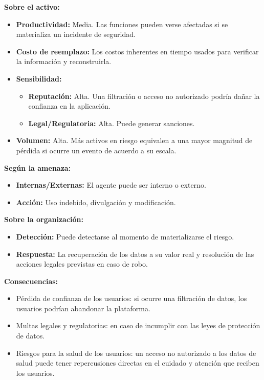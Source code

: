 \documentclass[a4paper,12pt]{article}
\begin{document}
    \par \textbf{Sobre el activo:}
    \begin{itemize}
        \item \textbf{Productividad:} Media. Las funciones pueden verse afectadas si se materializa un incidente de seguridad.
        \item \textbf{Costo de reemplazo:} Los costos inherentes en tiempo usados para verificar la información y reconstruirla.
        \item \textbf{Sensibilidad:}
        \begin{itemize}
            \item \textbf{Reputación:} Alta. Una filtración o acceso no autorizado podría dañar la confianza en la aplicación.
            \item \textbf{Legal/Regulatoria:} Alta. Puede generar sanciones.
        \end{itemize}
        \item \textbf{Volumen:} Alta. Más activos en riesgo equivalen a una mayor magnitud de pérdida si ocurre un evento de acuerdo a su escala.
    \end{itemize}
    \par \textbf{Según la amenaza:}
    \begin{itemize}
        \item \textbf{Internas/Externas:} El agente puede ser interno o externo.
        \item \textbf{Acción:} Uso indebido, divulgación y modificación.
    \end{itemize}
    \par \textbf{Sobre la organización:}
    \begin{itemize}
        \item \textbf{Detección:} Puede detectarse al momento de materializarse el riesgo.
        \item \textbf{Respuesta:} La recuperación de los datos a su valor real y resolución de las acciones legales previstas en caso de robo.
    \end{itemize}
    \par \textbf{Consecuencias:}
    \begin{itemize}
        \item Pérdida de confianza de los usuarios: si ocurre una filtración de datos, los usuarios podrían abandonar la plataforma.
        \item Multas legales y regulatorias: en caso de incumplir con las leyes de protección de datos.
        \item Riesgos para la salud de los usuarios: un acceso no autorizado a los datos de salud puede tener repercusiones directas en el cuidado y atención que reciben los usuarios.
    \end{itemize}
\end{document}

